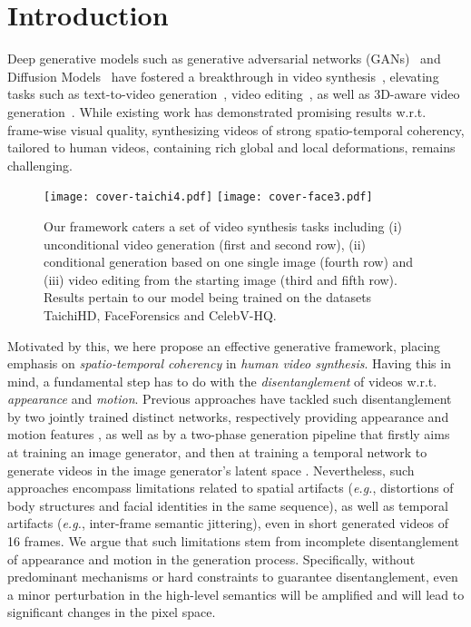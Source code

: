 {\section{Introduction}\label{intro}
Deep generative models such as generative adversarial networks (GANs)~\cite{goodfellow2014generative} and Diffusion Models~\cite{ddpm, ddim} have fostered a breakthrough in
video synthesis~\cite{vondrick2016generating, tulyakov2017mocogan, TGAN2020, wang2020g3an, wang2021inmodegan, digan, stylegan-v, tats, makeavideo, phenaki, imagenvideo}, elevating tasks such as text-to-video generation~\cite{makeavideo,phenaki}, video editing~\cite{bar2022text2live}, as well as 3D-aware video generation~\cite{bergman2022gnarf}. 
While existing work has demonstrated promising results w.r.t. frame-wise visual quality, synthesizing videos of strong spatio-temporal coherency,
tailored to human videos, containing rich global and local deformations, remains challenging.

\begin{figure*}[!ht]
\centering
\texttt{[image: cover-taichi4.pdf]}
\texttt{[image: cover-face3.pdf]}
\caption{Our framework caters a set of video synthesis tasks including (i) unconditional video generation (first and second row), (ii) conditional generation based on one single image (fourth row) and (iii) video editing from the starting image (third and fifth row). Results pertain to our model being trained on the datasets TaichiHD, FaceForensics and CelebV-HQ.}
\label{fig:cover}
\end{figure*}

Motivated by this, we here propose an effective generative framework, placing emphasis on \textit{spatio-temporal coherency} in \textit{human video synthesis}. Having this in mind, a fundamental step has to do with the \textit{disentanglement} of videos w.r.t. \textit{appearance} and \textit{motion}.
Previous approaches have tackled such disentanglement by two jointly trained distinct networks, respectively providing appearance and motion features \cite{tulyakov2017mocogan,wang2020g3an,wang2021inmodegan,WANG_2020_WACV,digan},
as well as by a two-phase generation pipeline that firstly aims at training an image generator, and then at training a temporal network to generate videos in the image generator's latent space \cite{mocoganhd,tats,videogpt}.
Nevertheless, such approaches encompass limitations related to spatial artifacts (\textit{e.g.}, distortions of body structures and facial identities in the same sequence), as well as temporal artifacts (\textit{e.g.}, inter-frame semantic jittering), even in short generated videos of 16 frames. 
We argue that such limitations stem from incomplete disentanglement of appearance and motion in the generation process.
Specifically, without predominant mechanisms or hard constraints to guarantee disentanglement, even a minor perturbation in the high-level semantics will be amplified and will lead to significant changes in the pixel space.

}
